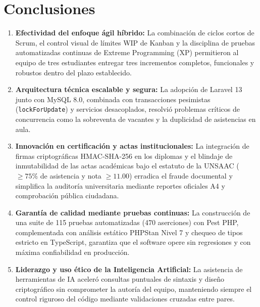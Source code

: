 \section{Conclusiones}

\begin{enumerate}
    \item \textbf{Efectividad del enfoque ágil híbrido:} La combinación de ciclos cortos de Scrum, el control visual de límites WIP de Kanban y la disciplina de pruebas automatizadas continuas de Extreme Programming (XP) permitieron al equipo de tres estudiantes entregar tres incrementos completos, funcionales y robustos dentro del plazo establecido.

    \item \textbf{Arquitectura técnica escalable y segura:} La adopción de Laravel 13 junto con MySQL 8.0, combinada con transacciones pesimistas (\texttt{lockForUpdate}) y servicios desacoplados, resolvió problemas críticos de concurrencia como la sobreventa de vacantes y la duplicidad de asistencias en aula.

    \item \textbf{Innovación en certificación y actas institucionales:} La integración de firmas criptográficas HMAC-SHA-256 en los diplomas y el blindaje de inmutabilidad de las actas académicas bajo el estatuto de la UNSAAC ($\ge 75\%$ de asistencia y nota $\ge 11.00$) erradica el fraude documental y simplifica la auditoría universitaria mediante reportes oficiales A4 y comprobación pública ciudadana.

    \item \textbf{Garantía de calidad mediante pruebas continuas:} La construcción de una suite de 115 pruebas automatizadas (470 aserciones) con Pest PHP, complementada con análisis estático PHPStan Nivel 7 y chequeo de tipos estricto en TypeScript, garantiza que el software opere sin regresiones y con máxima confiabilidad en producción.

    \item \textbf{Liderazgo y uso ético de la Inteligencia Artificial:} La asistencia de herramientas de IA aceleró consultas puntuales de sintaxis y diseño criptográfico sin comprometer la autoría del equipo, manteniendo siempre el control riguroso del código mediante validaciones cruzadas entre pares.
\end{enumerate}
